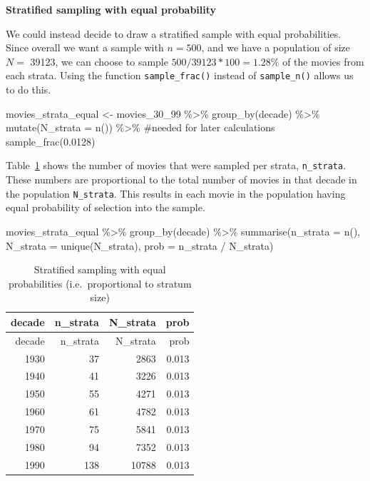 \documentclass[
  letterpaper,
  DIV=11,
  numbers=noendperiod]{scrreprt}
\newenvironment{Shaded}{\begin{snugshade}}{\end{snugshade}}
\newcommand{\AttributeTok}[1]{\textcolor[rgb]{0.40,0.45,0.13}{#1}}
\newcommand{\CommentTok}[1]{\textcolor[rgb]{0.37,0.37,0.37}{#1}}
\newcommand{\FloatTok}[1]{\textcolor[rgb]{0.68,0.00,0.00}{#1}}
\newcommand{\FunctionTok}[1]{\textcolor[rgb]{0.28,0.35,0.67}{#1}}
\newcommand{\NormalTok}[1]{\textcolor[rgb]{0.00,0.23,0.31}{#1}}
\newcommand{\OtherTok}[1]{\textcolor[rgb]{0.00,0.23,0.31}{#1}}
\newcommand{\SpecialCharTok}[1]{\textcolor[rgb]{0.37,0.37,0.37}{#1}}
\theoremstyle{definition}
\theoremstyle{remark}
\begin{document}
\textbf{Stratified sampling with equal probability}

We could instead decide to draw a stratified sample with equal
probabilities. Since overall we want a sample with \(n = 500\), and we
have a population of size \(N =\) 39123, we can choose to sample
\(500 / 39123 *100 = 1.28\%\) of the movies from each strata. Using the
function \texttt{sample\_frac()} instead of \texttt{sample\_n()} allows
us to do this.

\begin{Shaded}
\begin{Highlighting}[]
\NormalTok{movies\_strata\_equal }\OtherTok{\textless{}{-}}\NormalTok{ movies\_30\_99 }\SpecialCharTok{\%\textgreater{}\%} 
  \FunctionTok{group\_by}\NormalTok{(decade) }\SpecialCharTok{\%\textgreater{}\%} 
  \FunctionTok{mutate}\NormalTok{(}\AttributeTok{N\_strata =} \FunctionTok{n}\NormalTok{()) }\SpecialCharTok{\%\textgreater{}\%} \CommentTok{\#needed for later calculations}
  \FunctionTok{sample\_frac}\NormalTok{(}\FloatTok{0.0128}\NormalTok{)}
\end{Highlighting}
\end{Shaded}

Table~\ref{tbl-strata-probs-equal} shows the number of movies that were
sampled per strata, \texttt{n\_strata}. These numbers are proportional
to the total number of movies in that decade in the population
\texttt{N\_strata}. This results in each movie in the population having
equal probability of selection into the sample.

\begin{Shaded}
\begin{Highlighting}[]
\NormalTok{movies\_strata\_equal }\SpecialCharTok{\%\textgreater{}\%} 
  \FunctionTok{group\_by}\NormalTok{(decade) }\SpecialCharTok{\%\textgreater{}\%} 
  \FunctionTok{summarise}\NormalTok{(}\AttributeTok{n\_strata =} \FunctionTok{n}\NormalTok{(), }\AttributeTok{N\_strata =} \FunctionTok{unique}\NormalTok{(N\_strata), }
            \AttributeTok{prob =}\NormalTok{ n\_strata }\SpecialCharTok{/}\NormalTok{ N\_strata)}
\end{Highlighting}
\end{Shaded}

\hypertarget{tbl-strata-probs-equal}{}
\begin{longtable}[]{@{}rrrr@{}}
\caption{\label{tbl-strata-probs-equal}Stratified sampling with equal
probabilities (i.e.~proportional to stratum size)}\tabularnewline
\toprule()
decade & n\_strata & N\_strata & prob \\
\midrule()
\endfirsthead
\toprule()
decade & n\_strata & N\_strata & prob \\
\midrule()
\endhead
1930 & 37 & 2863 & 0.013 \\
1940 & 41 & 3226 & 0.013 \\
1950 & 55 & 4271 & 0.013 \\
1960 & 61 & 4782 & 0.013 \\
1970 & 75 & 5841 & 0.013 \\
1980 & 94 & 7352 & 0.013 \\
1990 & 138 & 10788 & 0.013 \\
\bottomrule()
\end{longtable}
\end{document}
